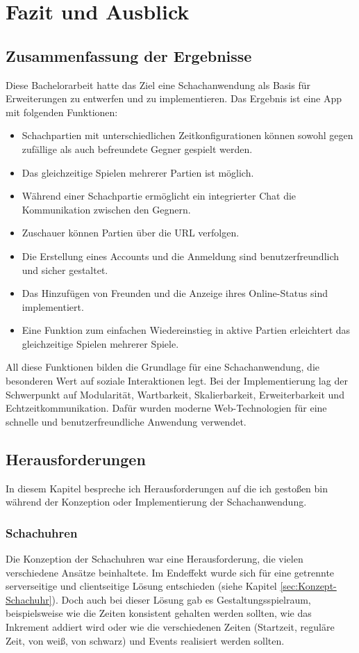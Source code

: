 
\chapter{Fazit und Ausblick}
    \section{Zusammenfassung der Ergebnisse}
Diese Bachelorarbeit hatte das Ziel eine Schachanwendung als Basis für Erweiterungen zu entwerfen und zu implementieren. Das Ergebnis ist eine App mit folgenden Funktionen:
\begin{itemize}
\item Schachpartien mit unterschiedlichen Zeitkonfigurationen können sowohl gegen zufällige als auch befreundete Gegner gespielt werden.
\item Das gleichzeitige Spielen mehrerer Partien ist möglich.
\item Während einer Schachpartie ermöglicht ein integrierter Chat die Kommunikation zwischen den Gegnern.
\item Zuschauer können Partien über die URL verfolgen.
\item Die Erstellung eines Accounts und die Anmeldung sind benutzerfreundlich und sicher gestaltet.
\item Das Hinzufügen von Freunden und die Anzeige ihres Online-Status sind implementiert.
\item Eine Funktion zum einfachen Wiedereinstieg in aktive Partien erleichtert das gleichzeitige Spielen mehrerer Spiele.
\end{itemize}

All diese Funktionen bilden die Grundlage für eine Schachanwendung, die besonderen Wert auf soziale Interaktionen legt. Bei der Implementierung lag der Schwerpunkt auf Modularität, Wartbarkeit, Skalierbarkeit, Erweiterbarkeit und Echtzeitkommunikation. Dafür wurden moderne Web-Technologien für eine schnelle und benutzerfreundliche Anwendung verwendet.

    \section{Herausforderungen}
In diesem Kapitel bespreche ich Herausforderungen auf die ich gestoßen bin während der Konzeption oder Implementierung der Schachanwendung. 

\subsection{Schachuhren}
\label{sec:herausforderung-Schachuhr}
Die Konzeption der Schachuhren war eine Herausforderung, die vielen verschiedene Ansätze beinhaltete. Im Endeffekt wurde sich für eine getrennte serverseitige und clientseitige Lösung entschieden (siehe Kapitel \ref{sec:Konzept-Schachuhr}). Doch auch bei dieser Lösung gab es Gestaltungsspielraum, beispielsweise wie die Zeiten konsistent gehalten werden sollten, wie das Inkrement addiert wird oder wie die verschiedenen Zeiten (Startzeit, reguläre Zeit, von weiß, von schwarz) und Events realisiert werden sollten.

